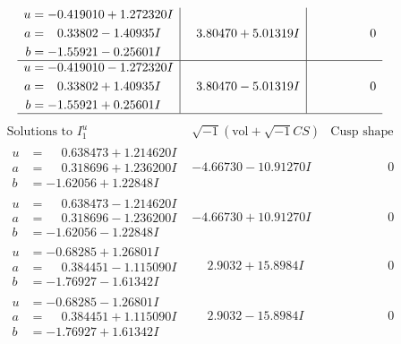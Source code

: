 \documentclass[1p]{elsarticle_modified}
\theoremstyle{definition}
\newcommand{\I}{\sqrt{-1}}
\begin{document}
$$\begin{array}{c|c|c}
\begin{aligned}
u &= -0.419010 + 1.272320 I \\
a &= \phantom{-}0.33802 - 1.40935 I \\
b &= -1.55921 - 0.25601 I\end{aligned}
 & \phantom{-}3.80470 + 5.01319 I & \phantom{-0.000000 } 0 \\ \hline\begin{aligned}
u &= -0.419010 - 1.272320 I \\
a &= \phantom{-}0.33802 + 1.40935 I \\
b &= -1.55921 + 0.25601 I\end{aligned}
 & \phantom{-}3.80470 - 5.01319 I & \phantom{-0.000000 } 0\\
 \hline 
 \end{array}$$\newpage$$\begin{array}{c|c|c}  
\text{Solutions to }I^u_{1}& \I (\text{vol} + \sqrt{-1}CS) & \text{Cusp shape}\\
 \hline 
\begin{aligned}
u &= \phantom{-}0.638473 + 1.214620 I \\
a &= \phantom{-}0.318696 + 1.236200 I \\
b &= -1.62056 + 1.22848 I\end{aligned}
 & -4.66730 - 10.91270 I & \phantom{-0.000000 } 0 \\ \hline\begin{aligned}
u &= \phantom{-}0.638473 - 1.214620 I \\
a &= \phantom{-}0.318696 - 1.236200 I \\
b &= -1.62056 - 1.22848 I\end{aligned}
 & -4.66730 + 10.91270 I & \phantom{-0.000000 } 0 \\ \hline\begin{aligned}
u &= -0.68285 + 1.26801 I \\
a &= \phantom{-}0.384451 - 1.115090 I \\
b &= -1.76927 - 1.61342 I\end{aligned}
 & \phantom{-}2.9032 + 15.8984 I & \phantom{-0.000000 } 0 \\ \hline\begin{aligned}
u &= -0.68285 - 1.26801 I \\
a &= \phantom{-}0.384451 + 1.115090 I \\
b &= -1.76927 + 1.61342 I\end{aligned}
 & \phantom{-}2.9032 - 15.8984 I & \phantom{-0.000000 } 0 \\ \hline\begin{aligned}

\end{aligned}
\end{array}$$
\end{document}

